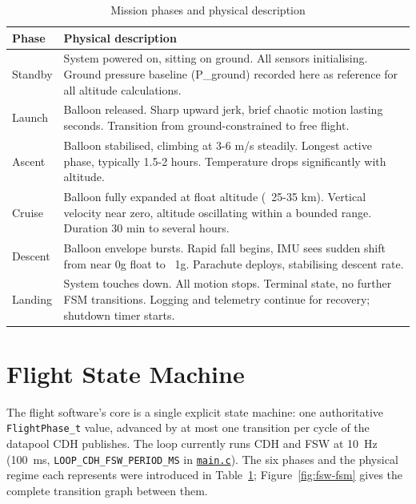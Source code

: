 \begin{table}[H]
\centering
\begin{tabular}{lp{10cm}}
\toprule
\textbf{Phase} & \textbf{Physical description} \\
\midrule
Standby & System powered on, sitting on ground. All sensors initialising. Ground pressure baseline (P\_ground) recorded here as reference for all altitude calculations. \\
Launch & Balloon released. Sharp upward jerk, brief chaotic motion lasting seconds. Transition from ground-constrained to free flight. \\
Ascent & Balloon stabilised, climbing at 3-6 m/s steadily. Longest active phase, typically 1.5-2 hours. Temperature drops significantly with altitude. \\
Cruise & Balloon fully expanded at float altitude (~25-35 km). Vertical velocity near zero, altitude oscillating within a bounded range. Duration 30 min to several hours. \\
Descent & Balloon envelope bursts. Rapid fall begins, IMU sees sudden shift from near 0g float to ~1g. Parachute deploys, stabilising descent rate. \\
Landing & System touches down. All motion stops. Terminal state, no further FSM transitions. Logging and telemetry continue for recovery; shutdown timer starts. \\
\bottomrule
\end{tabular}
\caption{Mission phases and physical description}
\label{tab:fsw-phases}
\end{table}

\section{Flight State Machine}
\label{sec:fsw-fsm}

The flight software's core is a single explicit state machine: one
authoritative \texttt{FlightPhase\_t} value, advanced by at most one
transition per cycle of the datapool CDH publishes. The loop currently
runs CDH and FSW at 10~Hz (100~ms, \texttt{LOOP\_CDH\_FSW\_PERIOD\_MS} in
\href{\repourl/blob/main/firmware-stm32/Core/Src/main.c}{\texttt{main.c}}). The six phases and the
physical regime each represents were introduced in
Table~\ref{tab:fsw-phases}; Figure~\ref{fig:fsw-fsm} gives the complete
transition graph between them.

